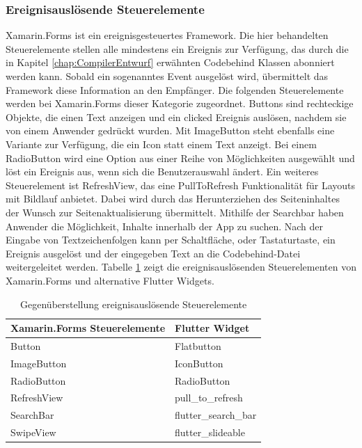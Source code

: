 \subsubsection{Ereignisauslösende Steuerelemente}
Xamarin.Forms ist ein ereignisgesteuertes Framework. Die hier behandelten Steuerelemente stellen alle mindestens ein Ereignis zur Verfügung,  das durch die in Kapitel \ref{chap:CompilerEntwurf} erwähnten Codebehind Klassen abonniert werden kann.  Sobald ein  sogenanntes Event ausgelöst wird,  übermittelt das Framework diese Information an den Empfänger.   Die folgenden Steuerelemente werden bei Xamarin.Forms dieser Kategorie zugeordnet.  \glq Buttons\grq{} sind rechteckige Objekte,  die einen Text anzeigen und ein \glq clicked\grq{} Ereignis auslösen, nachdem sie von einem Anwender gedrückt wurden.  Mit \glq ImageButton\grq{} steht ebenfalls eine Variante zur Verfügung,  die ein Icon statt einem Text anzeigt.  Bei einem \glq RadioButton\grq{} wird eine Option aus einer Reihe von Möglichkeiten ausgewählt und löst ein Ereignis aus,  wenn sich die Benutzerauswahl ändert.  Ein weiteres Steuerelement ist \glq RefreshView\grq{}, das eine \glq PullToRefresh\grq{}  Funktionalität für Layouts mit Bildlauf anbietet.  Dabei wird durch das Herunterziehen des Seiteninhaltes der Wunsch zur Seitenaktualisierung  übermittelt.  Mithilfe der \glq Searchbar\grq{} haben Anwender die Möglichkeit, Inhalte  innerhalb der App zu suchen.  Nach der  Eingabe von Textzeichenfolgen kann per Schaltfläche,  oder Tastaturtaste, ein Ereignis ausgelöst und der eingegeben Text an die Codebehind-Datei weitergeleitet werden.  Tabelle \ref{tab:eventcommands} zeigt die ereignisauslösenden Steuerelementen von Xamarin.Forms und alternative Flutter Widgets.
\begin{table}[!ht]
\begin{tabularx}{\textwidth}{X|X}
   \textbf{Xamarin.Forms Steuerelemente} & \textbf{Flutter Widget}  \\
\hline
	Button		       				&  	Flatbutton 		\\ 
	ImageButton		       		&  	IconButton 		\\ 
	RadioButton		       		&  	RadioButton 		\\ 
	RefreshView		       		&  	pull\_to\_refresh 		\\ 
	SearchBar		       			&  	flutter\_search\_bar 	\\ 
	SwipeView		       		&  	flutter\_slideable 		\\ 
\end{tabularx}
\caption{Gegenüberstellung ereignisauslösende Steuerelemente}
 \label{tab:eventcommands}
\end{table}

